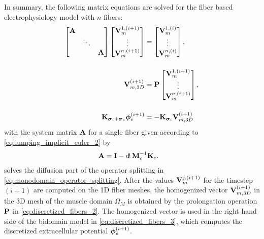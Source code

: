 In summary, the following matrix equations are solved for the fiber based electrophysiology model with $n$ fibers:
\begin{subequations}\label{eq:discretized_fibers}
  \begin{align}
    \left[\begin{array}{@{}ccc@{}}
      \bfA &&\\
      &\ddots&\\
      &&\bfA
    \end{array}\right]
    \left[\begin{array}{@{}c@{}}
      \bfV_{m}^{1,(i+1)}  \\
      \vdots\\
      \bfV_{m}^{n,(i+1)}
    \end{array}\right]
    &= 
    \left[\begin{array}{@{}c@{}}
      \bfV_{m}^{1,(i)}  \\
      \vdots\\
      \bfV_{m}^{n,(i)}
    \end{array}\right],\label{eq:discretized_fibers_1} \\[4mm]
    \bfV_{m,3D}^{(i+1)} &= \bfP \left[\begin{array}{@{}c@{}}
      \bfV_{m}^{1,(i+1)} \label{eq:discretized_fibers_2} \\
      \vdots\\
      \bfV_{m}^{n,(i+1)}
    \end{array}\right],\\[4mm]
    \bfK_{\bfsigma_i + \bfsigma_e} \bfphi_e^{(i+1)} &= -\bfK_{\bfsigma_i} \bfV_{m,3D}^{(i+1)} \label{eq:discretized_fibers_3}
  \end{align}
\end{subequations}
with the system matrix $\textbf{A}$ for a single fiber given according to \cref{eq:lumping_implicit_euler_2} by
\begin{align*}
  \bfA &= \bfI - \dt\,\bfM_c^{-1}\bfK_c.
\end{align*}
 solves the diffusion part of the operator splitting in \cref{eq:monodomain_operator_splitting}. After the values $\textbf{V}_{m}^{j,(i+1)}$ for the timestep $(i+1)$ are computed on the 1D fiber meshes, the homogenized vector $\textbf{V}_{m,3D}^{(i+1)}$ in the 3D mesh of the muscle domain $\Omega_M$ is obtained by the prolongation operation $\textbf{P}$ in \cref{eq:discretized_fibers_2}. The homogenized vector is used in the right hand side of the bidomain model in \cref{eq:discretized_fibers_3}, which computes the discretized extracellular potential $\boldsymbol{\phi}_e^{(i+1)}$.

